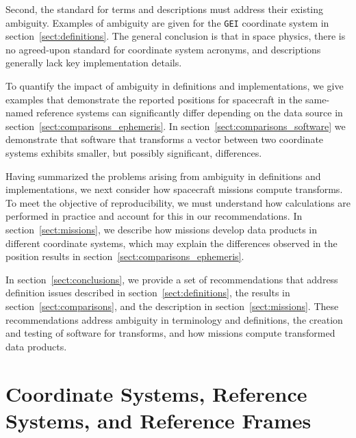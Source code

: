 \documentclass[draft]{agujournal2019}
\begin{document}
Second, the standard for terms and descriptions must address their existing ambiguity. Examples of ambiguity are given for the \texttt{GEI} coordinate system in section~\ref{sect:definitions}. The general conclusion is that in space physics, there is no agreed-upon standard for coordinate system acronyms, and descriptions generally lack key implementation details.

To quantify the impact of ambiguity in definitions and implementations, we give examples that demonstrate the reported positions for spacecraft in the same-named reference systems can significantly differ depending on the data source in section~\ref{sect:comparisons_ephemeris}. In section~\ref{sect:comparisons_software} we demonstrate that software that transforms a vector between two coordinate systems exhibits smaller, but possibly significant, differences.


Having summarized the problems arising from ambiguity in definitions and implementations, we next consider how spacecraft missions compute transforms. To meet the objective of reproducibility, we must understand how calculations are performed in practice and account for this in our recommendations. In section~\ref{sect:missions}, we describe how missions develop data products in different coordinate systems, which may explain the differences observed in the position results in section~\ref{sect:comparisons_ephemeris}.

In section~\ref{sect:conclusions}, we provide a set of recommendations that address definition issues described in section~\ref{sect:definitions}, the results in section~\ref{sect:comparisons}, and the description in section~\ref{sect:missions}. These recommendations address ambiguity in terminology and definitions, the creation and testing of software for transforms, and how missions compute transformed data products.

\section{Coordinate Systems, Reference Systems, and Reference Frames}
\label{sect:terminology}
\end{document}
